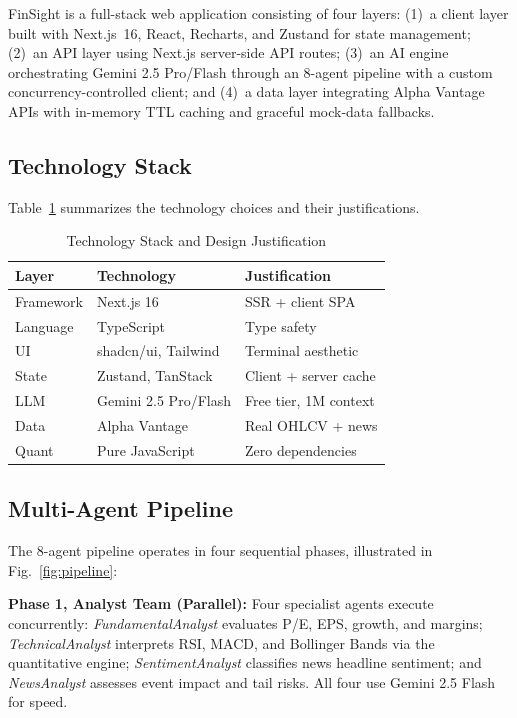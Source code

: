 \documentclass[conference]{IEEEtran}
\begin{document}
FinSight is a full-stack web application consisting of four layers: (1)~a client layer built with Next.js~16, React, Recharts, and Zustand for state management; (2)~an API layer using Next.js server-side API routes; (3)~an AI engine orchestrating Gemini 2.5 Pro/Flash through an 8-agent pipeline with a custom concurrency-controlled client; and (4)~a data layer integrating Alpha Vantage~\cite{alphavantage2024} APIs with in-memory TTL caching and graceful mock-data fallbacks.

\subsection{Technology Stack}

Table~\ref{tab:techstack} summarizes the technology choices and their justifications.

\begin{table}[htbp]
\caption{Technology Stack and Design Justification}
\label{tab:techstack}
\centering
\small
\begin{tabular}{@{}lll@{}}
\toprule
\textbf{Layer} & \textbf{Technology} & \textbf{Justification} \\
\midrule
Framework & Next.js 16 & SSR + client SPA \\
Language & TypeScript & Type safety \\
UI & shadcn/ui, Tailwind & Terminal aesthetic \\
State & Zustand, TanStack & Client + server cache \\
LLM & Gemini 2.5 Pro/Flash & Free tier, 1M context \\
Data & Alpha Vantage & Real OHLCV + news \\
Quant & Pure JavaScript & Zero dependencies \\
\bottomrule
\end{tabular}
\end{table}

\subsection{Multi-Agent Pipeline}

The 8-agent pipeline operates in four sequential phases, illustrated in Fig.~\ref{fig:pipeline}:

\textbf{Phase 1, Analyst Team (Parallel):} Four specialist agents execute concurrently: \textit{FundamentalAnalyst} evaluates P/E, EPS, growth, and margins; \textit{TechnicalAnalyst} interprets RSI, MACD, and Bollinger Bands via the quantitative engine; \textit{SentimentAnalyst} classifies news headline sentiment; and \textit{NewsAnalyst} assesses event impact and tail risks. All four use Gemini 2.5 Flash for speed.
\end{document}
